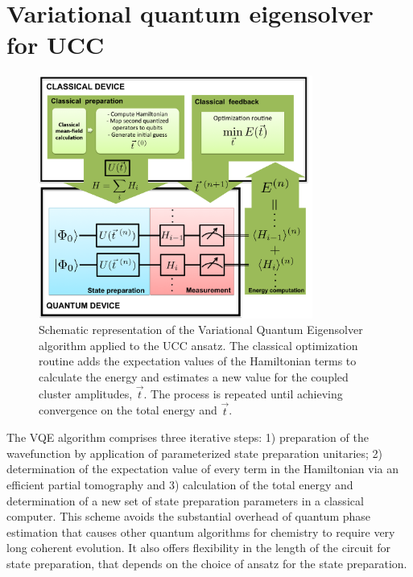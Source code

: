 \documentclass[superscriptaddress,aps,pra,twocolumn,nofootinbib,babel]{revtex4-1}
\begin{document}
\section{Variational quantum eigensolver for UCC}\label{sec:vqeucc}

\begin{figure}
\centering
\includegraphics[width=9cm]{figures/UCC.png}
%
\caption{Schematic representation of the Variational Quantum Eigensolver algorithm applied to the UCC ansatz. The classical optimization routine adds the expectation values of the Hamiltonian terms to calculate the energy and estimates a new value for the coupled cluster amplitudes, $\vec{t}$. The process is repeated until achieving  convergence on the total energy and $\vec{t}$.}\label{fig:UCCdiagram}
\end{figure}

The VQE algorithm comprises three iterative steps: 1) preparation of the wavefunction by application of parameterized state preparation unitaries; 2) determination of the expectation value of every term in the Hamiltonian via an efficient partial tomography \cite{McClean.JPCL.5.4368.2014} and 3) calculation of the total energy and determination of a new set of state preparation parameters in a classical computer. This scheme avoids the substantial overhead of quantum phase estimation that causes other quantum algorithms for chemistry to require very long coherent evolution. It also offers flexibility in the length of the circuit for state preparation, that depends on the choice of ansatz for the state preparation.
\end{document}
